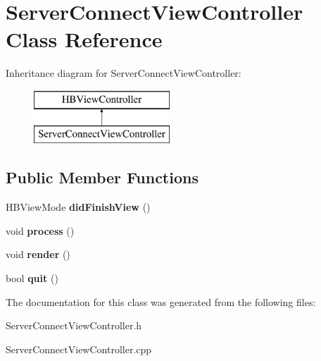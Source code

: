 \hypertarget{class_server_connect_view_controller}{\section{Server\-Connect\-View\-Controller Class Reference}
\label{class_server_connect_view_controller}
}
Inheritance diagram for Server\-Connect\-View\-Controller\-:\begin{figure}[H]
\begin{center}
\leavevmode
\includegraphics[height=2.000000cm]{class_server_connect_view_controller}
\end{center}
\end{figure}
\subsection*{Public Member Functions}
\begin{DoxyCompactItemize}
\item 
\hypertarget{class_server_connect_view_controller_adbe950a8af41236837cec1c151132f49}{H\-B\-View\-Mode {\bfseries did\-Finish\-View} ()}\label{class_server_connect_view_controller_adbe950a8af41236837cec1c151132f49}

\item 
\hypertarget{class_server_connect_view_controller_aab4ea172cba6914aa0d35d8ac5085e84}{void {\bfseries process} ()}\label{class_server_connect_view_controller_aab4ea172cba6914aa0d35d8ac5085e84}

\item 
\hypertarget{class_server_connect_view_controller_a608c67d2e278ae8ab5a95b5fef21dbc8}{void {\bfseries render} ()}\label{class_server_connect_view_controller_a608c67d2e278ae8ab5a95b5fef21dbc8}

\item 
\hypertarget{class_server_connect_view_controller_aedb4cdccaa547791f14c0db1634c82f6}{bool {\bfseries quit} ()}\label{class_server_connect_view_controller_aedb4cdccaa547791f14c0db1634c82f6}

\end{DoxyCompactItemize}


The documentation for this class was generated from the following files\-:\begin{DoxyCompactItemize}
\item 
Server\-Connect\-View\-Controller.\-h\item 
Server\-Connect\-View\-Controller.\-cpp\end{DoxyCompactItemize}
